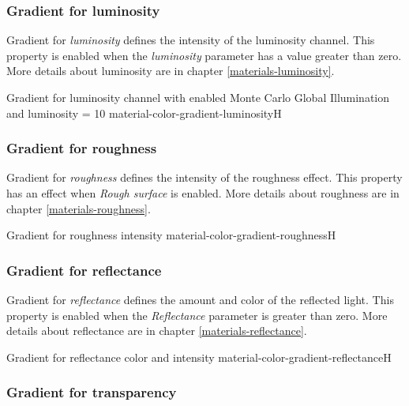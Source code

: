 \subsubsection{Gradient for luminosity}\label{materials-luminosity-gradient}
Gradient for \emph{luminosity} defines the intensity of the luminosity channel. This property is enabled when the \emph{luminosity} parameter has a value greater than zero. More details about luminosity are in chapter \ref{materials-luminosity}.

{Gradient for luminosity channel with enabled Monte Carlo Global Illumination and luminosity = 10}
{material-color-gradient-luminosity}{H}

\subsubsection{Gradient for roughness}\label{materials-roughness-gradient}

Gradient for \emph{roughness} defines the intensity of the roughness effect. This property has an effect when \emph{Rough surface} is enabled. More details about roughness are in chapter \ref{materials-roughness}.

{Gradient for roughness intensity}
{material-color-gradient-roughness}{H}

\subsubsection{Gradient for reflectance}\label{materials-reflectance-gradient}

Gradient for \emph{reflectance} defines the amount and color of the reflected light. This property is enabled when the \emph{Reflectance} parameter is greater than zero. More details about reflectance are in chapter \ref{materials-reflectance}.

{Gradient for reflectance color and intensity}
{material-color-gradient-reflectance}{H}

\subsubsection{Gradient for transparency}\label{materials-transparency-gradient}


